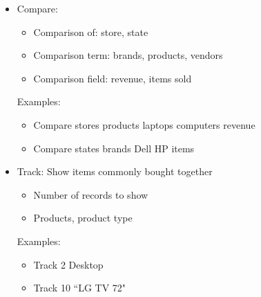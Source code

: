 \documentclass{article}
\begin{document}
\begin{itemize}
      \item
        Compare:
        \begin{itemize}
          \item Comparison of: store, state
          \item Comparison term: brands, products, vendors
          \item Comparison field: revenue, items sold
        \end{itemize}
        Examples:
        \begin{itemize}
          \item Compare stores products laptops computers revenue 
          \item Compare states brands Dell HP items
        \end{itemize}

      \item
        Track: Show items commonly bought together
        \begin{itemize}
          \item Number of records to show
          \item Products, product type
        \end{itemize}
        Examples:
        \begin{itemize}
          \item Track 2 Desktop
          \item Track 10 ``LG TV 72"
        \end{itemize}
    \end{itemize}

  
\end{document}
